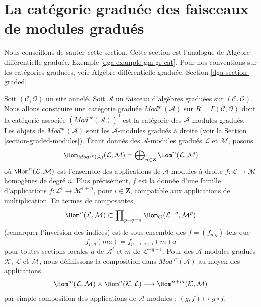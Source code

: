 \section{La catégorie graduée des faisceaux de modules gradués}
\label{section-gm-gr-cat}

\noindent
Nous conseillons de sauter cette section. Cette section est l'analogue de
Algèbre différentielle graduée, Exemple \ref{dga-example-gm-gr-cat}.
Pour nos conventions sur les catégories graduées, voir Algèbre différentielle
graduée, Section \ref{dga-section-graded}.

\medskip\noindent
Soit $(\mathcal{C}, \mathcal{O})$ un site annelé.
Soit $\mathcal{A}$ un faisceau d'algèbres graduées sur
$(\mathcal{C}, \mathcal{O})$. Nous allons construire une catégorie graduée
$\textit{Mod}^{gr}(\mathcal{A})$ sur $R = \Gamma(\mathcal{C}, \mathcal{O})$
dont la catégorie associée $(\textit{Mod}^{gr}(\mathcal{A}))^0$ est la
catégorie des $\mathcal{A}$-modules gradués. Les objets de
$\textit{Mod}^{gr}(\mathcal{A})$ sont les $\mathcal{A}$-modules gradués à
droite (voir la Section \ref{section-graded-modules}). Étant donnés des
$\mathcal{A}$-modules gradués $\mathcal{L}$ et $\mathcal{M}$, posons
$$
\Hom_{\textit{Mod}^{gr}(\mathcal{A})}(\mathcal{L}, \mathcal{M}) =
\bigoplus\nolimits_{n \in \mathbf{Z}} \Hom^n(\mathcal{L}, \mathcal{M})
$$
où $\Hom^n(\mathcal{L}, \mathcal{M})$ est l'ensemble des applications de
$\mathcal{A}$-modules à droite $f : \mathcal{L} \to \mathcal{M}$ homogènes
de degré $n$. Plus précisément, $f$ est la donnée d'une famille d'applications
$f : \mathcal{L}^i \to \mathcal{M}^{i + n}$, pour $i \in \mathbf{Z}$,
compatible aux applications de multiplication. En termes de composantes,
$$
\Hom^n(\mathcal{L}, \mathcal{M})
\subset
\prod\nolimits_{p + q = n}
\Hom_\mathcal{O}(\mathcal{L}^{-q}, \mathcal{M}^p)
$$
(remarquer l'inversion des indices) est le sous-ensemble des
$f = (f_{p, q})$ tels que
$$
f_{p, q}(m a) = f_{p - i, q + i}(m)a
$$
pour toutes sections locales $a$ de $\mathcal{A}^i$ et $m$ de
$\mathcal{L}^{-q - i}$. Pour des $\mathcal{A}$-modules gradués
$\mathcal{K}$, $\mathcal{L}$ et $\mathcal{M}$, nous définissons la composition
dans $\textit{Mod}^{gr}(\mathcal{A})$ au moyen des applications
$$
\Hom^m(\mathcal{L}, \mathcal{M}) \times
\Hom^n(\mathcal{K}, \mathcal{L}) \longrightarrow
\Hom^{n + m}(\mathcal{K}, \mathcal{M})
$$
par simple composition des applications de $\mathcal{A}$-modules :
$(g, f) \mapsto g \circ f$.






